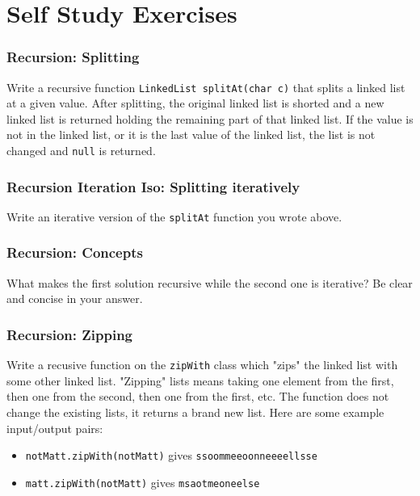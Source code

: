 \documentclass[twoside=false,DIV=14]{scrartcl}
\begin{document}
  \newpage\setcounter{section}{0}

  \part*{Self Study Exercises}

  \section{Recursion: Splitting}
  Write a recursive function \lstinline|LinkedList splitAt(char c)| that splits a linked list at a given value.  After splitting, the original linked list is shorted and a new linked list is returned holding the remaining part of that linked list.  If the value is not in the linked list, or it is the last value of the linked list, the list is not changed and \lstinline|null| is returned.

  \section{Recursion Iteration Iso: Splitting iteratively}
  Write an iterative version of the \lstinline|splitAt| function you wrote above.

  \section{Recursion: Concepts}
  What makes the first solution recursive while the second one is iterative?  Be clear and concise in  your answer.

  \section{Recursion: Zipping}
  Write a recusive function on the \lstinline|zipWith| class which "zips" the linked list with some other linked list.  "Zipping" lists means taking one element from the first, then one from the second, then one from the first, etc.  The function does not change the existing lists, it returns a brand new list.  Here are some example input/output pairs:
  \begin{itemize}
  \item \lstinline|notMatt.zipWith(notMatt)| gives \lstinline|ssoommeeoonneeeellsse|
  \item \lstinline|matt.zipWith(notMatt)| gives \lstinline|msaotmeoneelse|
  \end{itemize} 
\end{document}
